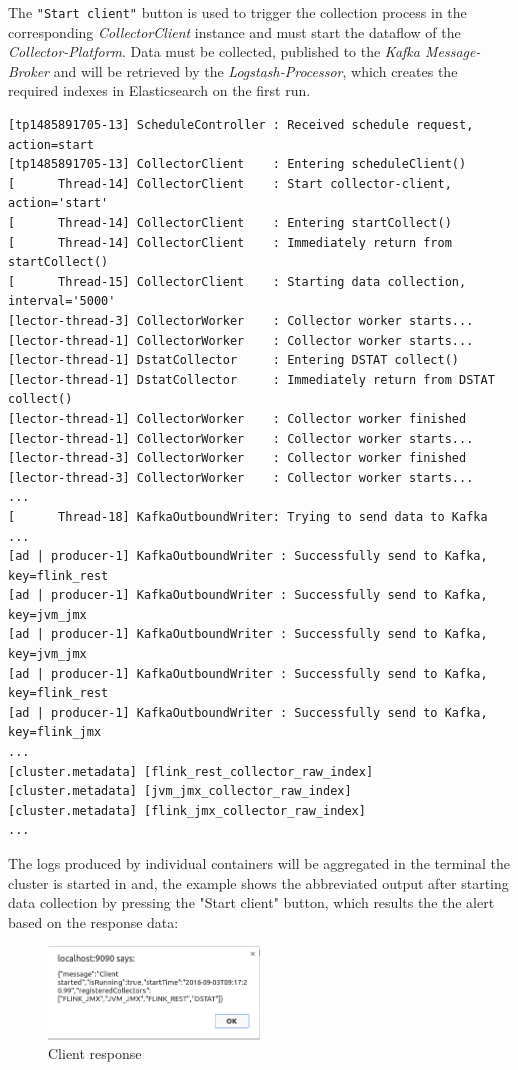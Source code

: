 The \verb|"Start client"| button is used to trigger the collection process in the corresponding \textit{CollectorClient} instance and
must start the dataflow of the \textit{Collector-Platform}. Data must be collected, published to the \textit{Kafka Message-Broker} and will
be retrieved by the \textit{Logstash-Processor}, which creates the required indexes in Elasticsearch on the first run.
\begin{verbatim}
[tp1485891705-13] ScheduleController : Received schedule request, action=start
[tp1485891705-13] CollectorClient    : Entering scheduleClient()
[      Thread-14] CollectorClient    : Start collector-client, action='start'
[      Thread-14] CollectorClient    : Entering startCollect()
[      Thread-14] CollectorClient    : Immediately return from startCollect()
[      Thread-15] CollectorClient    : Starting data collection, interval='5000'
[lector-thread-3] CollectorWorker    : Collector worker starts...
[lector-thread-1] CollectorWorker    : Collector worker starts...
[lector-thread-1] DstatCollector     : Entering DSTAT collect()
[lector-thread-1] DstatCollector     : Immediately return from DSTAT collect()
[lector-thread-1] CollectorWorker    : Collector worker finished
[lector-thread-1] CollectorWorker    : Collector worker starts...
[lector-thread-3] CollectorWorker    : Collector worker finished
[lector-thread-3] CollectorWorker    : Collector worker starts...
...
[      Thread-18] KafkaOutboundWriter: Trying to send data to Kafka
...
[ad | producer-1] KafkaOutboundWriter : Successfully send to Kafka, key=flink_rest
[ad | producer-1] KafkaOutboundWriter : Successfully send to Kafka, key=jvm_jmx
[ad | producer-1] KafkaOutboundWriter : Successfully send to Kafka, key=jvm_jmx
[ad | producer-1] KafkaOutboundWriter : Successfully send to Kafka, key=flink_rest
[ad | producer-1] KafkaOutboundWriter : Successfully send to Kafka, key=flink_jmx
...
[cluster.metadata] [flink_rest_collector_raw_index]
[cluster.metadata] [jvm_jmx_collector_raw_index]
[cluster.metadata] [flink_jmx_collector_raw_index]
...
\end{verbatim}

The logs produced by individual containers will be aggregated in the terminal the cluster is started in and, the example shows the
abbreviated output after starting data collection by pressing the "Start client" button, which results the the alert based on the response data:

\begin{figure}[H]
	\centering
	\includegraphics[width=0.5\textwidth]{../images/11-alert.png}
	\caption{Client response}
	\label{fig:alert}
\end{figure}


